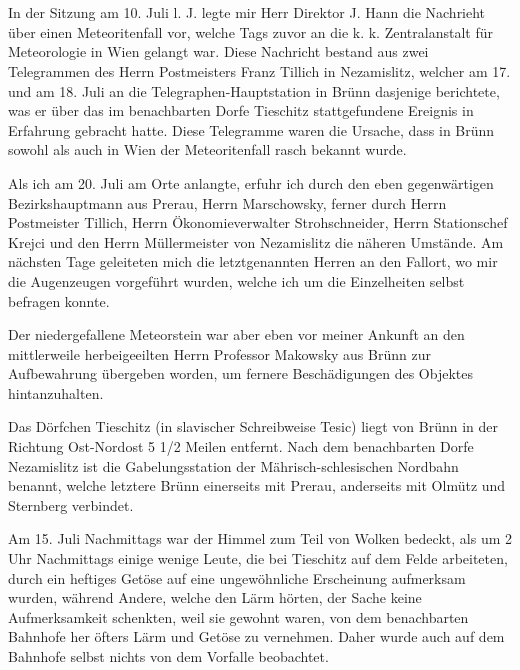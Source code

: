 \documentclass[a4paper, 11pt, oneside]{article}
\begin{document}
\section{}
\paragraph{}
In der Sitzung am 10. Juli l. J. legte mir Herr Direktor J. Hann die Nachrieht über einen Meteoritenfall vor, welche Tags zuvor an die k. k. Zentralanstalt für Meteorologie in Wien gelangt war. Diese Nachricht bestand aus zwei Telegrammen des Herrn Postmeisters Franz Tillich in Nezamislitz, welcher am 17. und am 18. Juli an die Telegraphen-Hauptstation in Brünn dasjenige berichtete, was er über das im benachbarten Dorfe Tieschitz stattgefundene Ereignis in Erfahrung gebracht hatte. Diese Telegramme waren die Ursache, dass in Brünn sowohl als auch in Wien der Meteoritenfall rasch bekannt wurde.

Als ich am 20. Juli am Orte anlangte, erfuhr ich durch den eben gegenwärtigen Bezirkshauptmann aus Prerau, Herrn Marschowsky, ferner durch Herrn Postmeister Tillich, Herrn Ökonomieverwalter Strohschneider, Herrn Stationschef Krejci und den Herrn Müllermeister von Nezamislitz die näheren Umstände. Am nächsten Tage geleiteten mich die letztgenannten Herren an den Fallort, wo mir die Augenzeugen vorgeführt wurden, welche ich um die Einzelheiten selbst befragen konnte.

Der niedergefallene Meteorstein war aber eben vor meiner Ankunft an den mittlerweile herbeigeeilten Herrn Professor Makowsky aus Brünn zur Aufbewahrung übergeben worden, um fernere Beschädigungen des Objektes hintanzuhalten.

Das Dörfchen Tieschitz (in slavischer Schreibweise Tesic) liegt von Brünn in der Richtung Ost-Nordost 5 1/2 Meilen entfernt. Nach dem benachbarten Dorfe Nezamislitz ist die Gabelungsstation der Mährisch-schlesischen Nordbahn benannt, welche letztere Brünn einerseits mit Prerau, anderseits mit Olmütz und Sternberg verbindet.

Am 15. Juli Nachmittags war der Himmel zum Teil von Wolken bedeckt, als um 2 Uhr Nachmittags einige wenige Leute, die bei Tieschitz auf dem Felde arbeiteten, durch ein heftiges Getöse auf eine ungewöhnliche Erscheinung aufmerksam wurden, während Andere, welche den Lärm hörten, der Sache keine Aufmerksamkeit schenkten, weil sie gewohnt waren, von dem benachbarten Bahnhofe her öfters Lärm und Getöse zu vernehmen. Daher wurde auch auf dem Bahnhofe selbst nichts von dem Vorfalle beobachtet.
\end{document}
